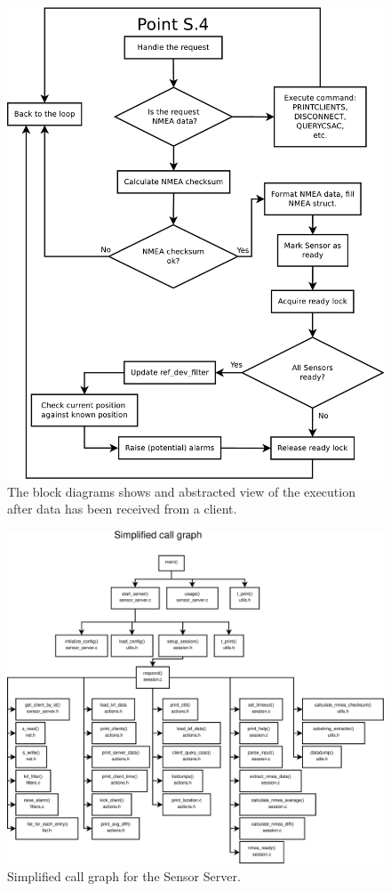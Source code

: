 \documentclass[12pt,english,a4paper]{report}
\begin{document}
\begin{figure}\label{actions_core}
\centering
  \includegraphics[scale=0.40]{actions_core.pdf}
   \caption[Socket Server execution flow block diagram]{The block diagrams shows and abstracted view of the execution after data has been received from a client.}
\end{figure}

\begin{figure}\label{server_call_graph}
\centering
  \includegraphics[scale=0.3]{server_call_graph.pdf}
   \caption[Sensor Server simplified call graph]{Simplified call graph for the Sensor Server.}
\end{figure}
\end{document}
